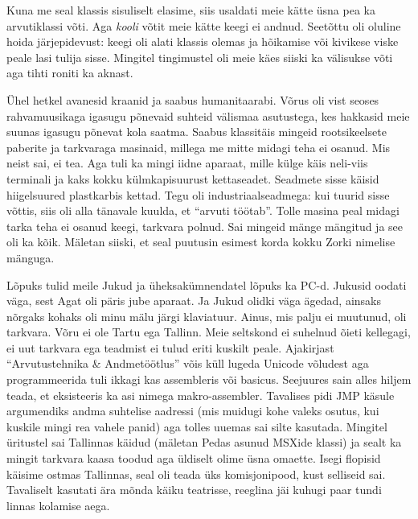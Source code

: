 Kuna me seal klassis sisuliselt elasime, siis usaldati meie kätte üsna pea ka 
arvutiklassi võti. Aga \emph{kooli} võtit meie kätte keegi ei andnud. Seetõttu 
oli oluline hoida järjepidevust: keegi oli alati klassis olemas ja hõikamise 
või kivikese viske peale lasi tulija sisse. Mingitel tingimustel oli meie käes 
siiski ka välisukse võti aga tihti roniti ka aknast. 

Ühel hetkel avanesid kraanid ja saabus humanitaarabi. Võrus oli vist seoses 
rahvamuusikaga igasugu põnevaid suhteid välismaa asutustega, kes hakkasid meie 
suunas igasugu põnevat kola saatma. Saabus klassitäis mingeid rootsikeelsete 
paberite ja tarkvaraga masinaid, millega me mitte midagi teha ei osanud. Mis 
neist sai, ei tea. Aga tuli ka mingi iidne aparaat, mille külge käis neli-viis 
terminali ja kaks kokku külmkapisuurust kettaseadet. Seadmete sisse käisid 
hiigelsuured plastkarbis kettad. Tegu oli industriaalseadmega: kui tuurid sisse 
võttis, siis oli alla tänavale kuulda, et \enquote{arvuti töötab}. Tolle masina 
peal midagi tarka teha ei osanud keegi, tarkvara polnud. Sai mingeid mänge 
mängitud ja see oli ka kõik. Mäletan siiski, et seal puutusin esimest korda 
kokku Zorki nimelise mänguga.

Lõpuks tulid meile Jukud ja üheksakümnendatel lõpuks ka 
PC-d. Jukusid oodati väga, sest Agat oli päris jube aparaat. 
Ja Jukud olidki väga ägedad, ainsaks nõrgaks kohaks oli minu mälu järgi 
klaviatuur. Ainus, mis palju ei muutunud, oli tarkvara. Võru ei ole Tartu ega 
Tallinn. Meie seltskond ei suhelnud õieti kellegagi, ei uut tarkvara ega 
teadmist ei tulud eriti kuskilt peale. Ajakirjast \enquote{Arvutustehnika \& 
Andmetöötlus} võis küll lugeda Unicode võludest aga programmeerida tuli ikkagi 
kas assembleris või basicus. Seejuures sain alles hiljem teada, et eksisteeris 
ka asi nimega makro-assembler. Tavalises pidi JMP käsule argumendiks andma 
suhtelise aadressi (mis muidugi kohe valeks osutus, kui kuskile mingi rea 
vahele panid) aga tolles 
uuemas sai silte kasutada. Mingitel üritustel sai Tallinnas käidud (mäletan 
Pedas asunud MSXide klassi) 
ja sealt ka mingit tarkvara kaasa toodud aga üldiselt olime üsna omaette. Isegi 
flopisid käisime ostmas Tallinnas, seal oli teada üks komisjonipood, kust 
selliseid sai. Tavaliselt kasutati ära mõnda käiku teatrisse, reeglina jäi 
kuhugi paar tundi linnas kolamise aega. 

